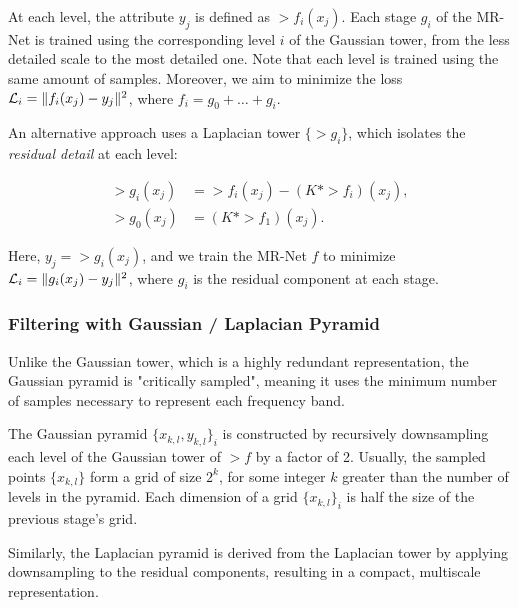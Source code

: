 At each level, the attribute $y_j$ is defined as $\gt{f}_i(x_j)$. Each stage $g_i$ of the MR-Net is trained using the corresponding level $i$ of the Gaussian tower, from the less detailed scale to the most detailed one. Note that each level is trained using the same amount of samples. Moreover, we aim to minimize the loss $\mathcal{L}_i = \lVert f_i(x_j)-y_j\rVert^2$, where $f_i = g_0 + \dots + g_{i}$.

An alternative approach uses a Laplacian tower \( \{\gt{g}_i\} \), which isolates the \textit{residual detail} at each level:

\begin{align*}
    \gt{g}_i(x_j) &= \gt{f}_i(x_j) - \left(K * \gt{f}_i\right)(x_j), \\
    \gt{g}_0(x_j) &= \left(K * \gt{f}_1\right)(x_j).
\end{align*}

Here, $y_j = \gt{g}_i(x_j)$, and we train the MR-Net $f$ to minimize $\mathcal{L}_i = \lVert g_i(x_j)-y_j\rVert^2$, where $g_i$ is the residual component at each stage.


\subsubsection{Filtering with Gaussian / Laplacian Pyramid}

Unlike the Gaussian tower, which is a highly redundant representation, the Gaussian pyramid is "critically sampled", meaning it uses the minimum number of samples necessary to represent each frequency band.

The Gaussian pyramid $\{x_{k,l}, y_{k,l}\}_i$ is constructed by recursively downsampling each level of the Gaussian tower of $\gt{f}$ by a factor of 2. Usually, the sampled points \( \{x_{k,l}\} \) form a grid of size \( 2^k \), for some integer $k$ greater than the number of levels in the pyramid. Each dimension of a grid $\{x_{k,l}\}_i$ is half the size of the previous stage's grid.

Similarly, the Laplacian pyramid is derived from the Laplacian tower by applying downsampling to the residual components, resulting in a compact, multiscale representation.



